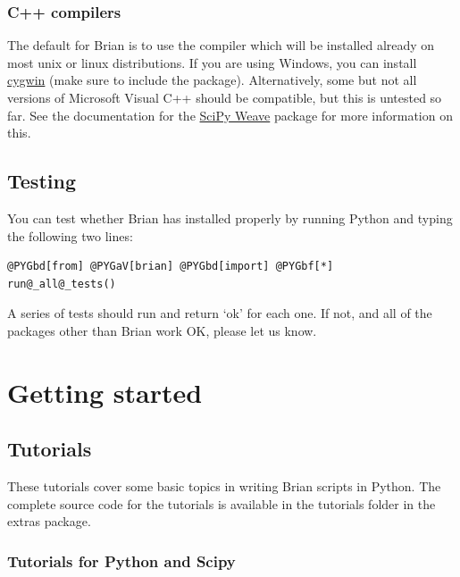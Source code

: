 \documentclass[letterpaper,10pt,english]{manual}
\begin{document}
\subsection{C++ compilers}

The default for Brian is to use the  compiler which will
be installed already on most unix or linux distributions. If you are using Windows, you can
install \href{http://www.cygwin.com/}{cygwin} (make sure to include the  package). Alternatively,
some but not all versions of Microsoft Visual C++ should be compatible, but this is untested
so far. See the documentation for the \href{http://www.scipy.org/Weave}{SciPy Weave} package for
more information on this.


\section{Testing}

You can test whether Brian has installed properly by running Python and typing
the following two lines:

\begin{Verbatim}[commandchars=@\[\]]
@PYGbd[from] @PYGaV[brian] @PYGbd[import] @PYGbf[*]
run@_all@_tests()
\end{Verbatim}

A series of tests should run and return `ok' for each one. If not, and all of the packages other than
Brian work OK, please let us know.

\resetcurrentobjects
\hypertarget{--doc-slowstart}{}

\chapter{Getting started}

\resetcurrentobjects
\hypertarget{--doc-tutorials}{}

\section{Tutorials}

These tutorials cover some basic topics in writing Brian scripts in Python. The
complete source code for the tutorials is available in the tutorials folder
in the extras package.

\resetcurrentobjects
\hypertarget{--doc-othertutorials}{}

\subsection{Tutorials for Python and Scipy}
\end{document}
